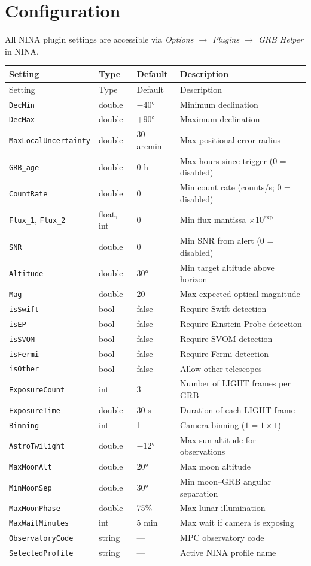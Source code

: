 \documentclass[12pt,a4paper]{article}
\begin{document}
\section{Configuration}

All NINA plugin settings are accessible via
\textit{Options $\to$ Plugins $\to$ GRB Helper} in NINA.

\begin{longtable}{lllp{5.5cm}}
\toprule
Setting & Type & Default & Description \\
\midrule
\endfirsthead
\toprule
Setting & Type & Default & Description \\
\midrule
\endhead
\bottomrule
\endfoot
\texttt{DecMin} & double & $-40°$ & Minimum declination \\
\texttt{DecMax} & double & $+90°$ & Maximum declination \\
\texttt{MaxLocalUncertainty} & double & 30 arcmin & Max positional error radius \\
\texttt{GRB\_age} & double & 0 h & Max hours since trigger (0 = disabled) \\
\texttt{CountRate} & double & 0 & Min count rate (counts/s; 0 = disabled) \\
\texttt{Flux\_1}, \texttt{Flux\_2} & float, int & 0 & Min flux mantissa $\times 10^{\text{exp}}$ \\
\texttt{SNR} & double & 0 & Min SNR from alert (0 = disabled) \\
\texttt{Altitude} & double & 30° & Min target altitude above horizon \\
\texttt{Mag} & double & 20 & Max expected optical magnitude \\
\texttt{isSwift} & bool & false & Require Swift detection \\
\texttt{isEP} & bool & false & Require Einstein Probe detection \\
\texttt{isSVOM} & bool & false & Require SVOM detection \\
\texttt{isFermi} & bool & false & Require Fermi detection \\
\texttt{isOther} & bool & false & Allow other telescopes \\
\texttt{ExposureCount} & int & 3 & Number of LIGHT frames per GRB \\
\texttt{ExposureTime} & double & 30 s & Duration of each LIGHT frame \\
\texttt{Binning} & int & 1 & Camera binning ($1=1{\times}1$) \\
\texttt{AstroTwilight} & double & $-12°$ & Max sun altitude for observations \\
\texttt{MaxMoonAlt} & double & 20° & Max moon altitude \\
\texttt{MinMoonSep} & double & 30° & Min moon--GRB angular separation \\
\texttt{MaxMoonPhase} & double & 75\% & Max lunar illumination \\
\texttt{MaxWaitMinutes} & int & 5 min & Max wait if camera is exposing \\
\texttt{ObservatoryCode} & string & --- & MPC observatory code \\
\texttt{SelectedProfile} & string & --- & Active NINA profile name \\
\end{longtable}
\end{document}
